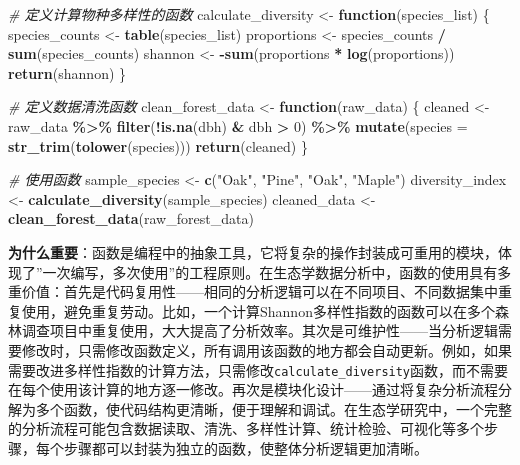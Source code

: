 \documentclass[
]{book}
\newenvironment{Shaded}{\begin{snugshade}}{\end{snugshade}}
\newcommand{\AttributeTok}[1]{\textcolor[rgb]{0.13,0.29,0.53}{#1}}
\newcommand{\CommentTok}[1]{\textcolor[rgb]{0.56,0.35,0.01}{\textit{#1}}}
\newcommand{\ControlFlowTok}[1]{\textcolor[rgb]{0.13,0.29,0.53}{\textbf{#1}}}
\newcommand{\DecValTok}[1]{\textcolor[rgb]{0.00,0.00,0.81}{#1}}
\newcommand{\FunctionTok}[1]{\textcolor[rgb]{0.13,0.29,0.53}{\textbf{#1}}}
\newcommand{\NormalTok}[1]{#1}
\newcommand{\OtherTok}[1]{\textcolor[rgb]{0.56,0.35,0.01}{#1}}
\newcommand{\SpecialCharTok}[1]{\textcolor[rgb]{0.81,0.36,0.00}{\textbf{#1}}}
\newcommand{\StringTok}[1]{\textcolor[rgb]{0.31,0.60,0.02}{#1}}
\begin{document}
\begin{Shaded}
\begin{Highlighting}[]
\CommentTok{\# 定义计算物种多样性的函数}
\NormalTok{calculate\_diversity }\OtherTok{\textless{}{-}} \ControlFlowTok{function}\NormalTok{(species\_list) \{}
\NormalTok{  species\_counts }\OtherTok{\textless{}{-}} \FunctionTok{table}\NormalTok{(species\_list)}
\NormalTok{  proportions }\OtherTok{\textless{}{-}}\NormalTok{ species\_counts }\SpecialCharTok{/} \FunctionTok{sum}\NormalTok{(species\_counts)}
\NormalTok{  shannon }\OtherTok{\textless{}{-}} \SpecialCharTok{{-}}\FunctionTok{sum}\NormalTok{(proportions }\SpecialCharTok{*} \FunctionTok{log}\NormalTok{(proportions))}
  \FunctionTok{return}\NormalTok{(shannon)}
\NormalTok{\}}

\CommentTok{\# 定义数据清洗函数}
\NormalTok{clean\_forest\_data }\OtherTok{\textless{}{-}} \ControlFlowTok{function}\NormalTok{(raw\_data) \{}
\NormalTok{  cleaned }\OtherTok{\textless{}{-}}\NormalTok{ raw\_data }\SpecialCharTok{\%\textgreater{}\%}
    \FunctionTok{filter}\NormalTok{(}\SpecialCharTok{!}\FunctionTok{is.na}\NormalTok{(dbh) }\SpecialCharTok{\&}\NormalTok{ dbh }\SpecialCharTok{\textgreater{}} \DecValTok{0}\NormalTok{) }\SpecialCharTok{\%\textgreater{}\%}
    \FunctionTok{mutate}\NormalTok{(}\AttributeTok{species =} \FunctionTok{str\_trim}\NormalTok{(}\FunctionTok{tolower}\NormalTok{(species)))}
  \FunctionTok{return}\NormalTok{(cleaned)}
\NormalTok{\}}

\CommentTok{\# 使用函数}
\NormalTok{sample\_species }\OtherTok{\textless{}{-}} \FunctionTok{c}\NormalTok{(}\StringTok{"Oak"}\NormalTok{, }\StringTok{"Pine"}\NormalTok{, }\StringTok{"Oak"}\NormalTok{, }\StringTok{"Maple"}\NormalTok{)}
\NormalTok{diversity\_index }\OtherTok{\textless{}{-}} \FunctionTok{calculate\_diversity}\NormalTok{(sample\_species)}
\NormalTok{cleaned\_data }\OtherTok{\textless{}{-}} \FunctionTok{clean\_forest\_data}\NormalTok{(raw\_forest\_data)}
\end{Highlighting}
\end{Shaded}

\textbf{为什么重要}：函数是编程中的抽象工具，它将复杂的操作封装成可重用的模块，体现了''一次编写，多次使用''的工程原则。在生态学数据分析中，函数的使用具有多重价值：首先是代码复用性------相同的分析逻辑可以在不同项目、不同数据集中重复使用，避免重复劳动。比如，一个计算Shannon多样性指数的函数可以在多个森林调查项目中重复使用，大大提高了分析效率。其次是可维护性------当分析逻辑需要修改时，只需修改函数定义，所有调用该函数的地方都会自动更新。例如，如果需要改进多样性指数的计算方法，只需修改\texttt{calculate\_diversity}函数，而不需要在每个使用该计算的地方逐一修改。再次是模块化设计------通过将复杂分析流程分解为多个函数，使代码结构更清晰，便于理解和调试。在生态学研究中，一个完整的分析流程可能包含数据读取、清洗、多样性计算、统计检验、可视化等多个步骤，每个步骤都可以封装为独立的函数，使整体分析逻辑更加清晰。
\end{document}

